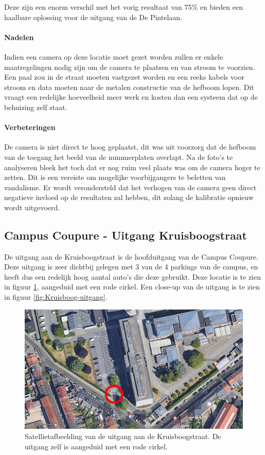 Deze zijn een enorm verschil met het vorig resultaat van 75\% en bieden een haalbare oplossing voor de uitgang van de De Pintelaan.

\paragraph{Nadelen}
Indien een camera op deze locatie moet gezet worden zullen er enkele maatregelingen nodig zijn om de camera te plaatsen en van stroom te voorzien. Een paal zou in de straat moeten vastgezet worden en een reeks kabels voor stroom en data moeten naar de metalen constructie van de hefboom lopen. Dit vraagt een redelijke hoeveelheid meer werk en kosten dan een systeem dat op de behuizing zelf staat.

\paragraph{Verbeteringen}
De camera is niet direct te hoog geplaatst, dit was uit voorzorg dat de hefboom van de toegang het beeld van de nummerplaten overlapt. Na de foto's te analyseren bleek het toch dat er nog ruim veel plaats was om de camera hoger te zetten. Dit is een vereiste om mogelijke voorbijgangers te beletten van vandalisme. Er wordt verondersteld dat het verhogen van de camera geen direct negatieve invloed op de resultaten zal hebben, dit zolang de kalibratie opnieuw wordt uitgevoerd.

\subsection{Campus Coupure - Uitgang Kruisboogstraat}

De uitgang aan de Kruisboogstraat is de hoofduitgang van de Campus Coupure. Deze uitgang is zeer dichtbij gelegen met 3 van de 4 parkings van de campus, en heeft dus een redelijk hoog aantal auto's die deze gebruikt. Deze locatie is te zien in figuur \ref{fig:sat-kruisboog}, aangeduid met een rode cirkel. Een close-up van de uitgang is te zien in figuur \ref{fig:Kruisboog-uitgang}. 

\begin{figure}[h!]
	\centering
	\includegraphics[width=\linewidth]{img/kruisboog/sateliet-kruisboog.jpg}
	\caption{Satellietafbeelding van de uitgang aan de Kruisboogstraat. De uitgang zelf is aangeduid met een rode cirkel. \autocite{ugent2019google}}
	\label{fig:sat-kruisboog}
\end{figure}

